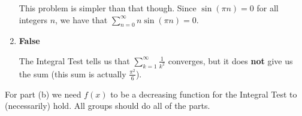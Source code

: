 \documentclass[]{ximera}
\begin{document}
\begin{problem}
\begin{freeResponse}
\begin{enumerate}
		This problem is simpler than that though.  
		Since $\sin(\pi n) = 0$ for all integers $n$, we have that $\sum_{n=0}^\infty n \sin(\pi n) = 0$.
		
		
		
		\item  {\bf False}
		
		The Integral Test tells us that $\sum_{k=1}^\infty \frac{1}{k^2}$ converges, but it does {\bf not} give us the sum (this sum is actually $\frac{\pi^2}{6}$).  
		
		\end{enumerate}
	\end{freeResponse}
	
\end{problem}

\begin{instructorNotes}
For part (b) we need $f(x)$ to be a decreasing function for the Integral Test to (necessarily) hold.
All groups should do all of the parts.
\end{instructorNotes}
\end{document}
